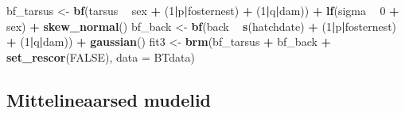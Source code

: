 \documentclass[]{book}
\newenvironment{Shaded}{\begin{snugshade}}{\end{snugshade}}
\newcommand{\KeywordTok}[1]{\textcolor[rgb]{0.13,0.29,0.53}{\textbf{#1}}}
\newcommand{\DataTypeTok}[1]{\textcolor[rgb]{0.13,0.29,0.53}{#1}}
\newcommand{\DecValTok}[1]{\textcolor[rgb]{0.00,0.00,0.81}{#1}}
\newcommand{\StringTok}[1]{\textcolor[rgb]{0.31,0.60,0.02}{#1}}
\newcommand{\OtherTok}[1]{\textcolor[rgb]{0.56,0.35,0.01}{#1}}
\newcommand{\OperatorTok}[1]{\textcolor[rgb]{0.81,0.36,0.00}{\textbf{#1}}}
\newcommand{\NormalTok}[1]{#1}
\begin{document}
\begin{Shaded}
\begin{Highlighting}[]
\NormalTok{bf_tarsus <-}\StringTok{ }\KeywordTok{bf}\NormalTok{(tarsus }\OperatorTok{~}\StringTok{ }\NormalTok{sex }\OperatorTok{+}\StringTok{ }\NormalTok{(}\DecValTok{1}\OperatorTok{|}\NormalTok{p}\OperatorTok{|}\NormalTok{fosternest) }\OperatorTok{+}\StringTok{ }\NormalTok{(}\DecValTok{1}\OperatorTok{|}\NormalTok{q}\OperatorTok{|}\NormalTok{dam)) }\OperatorTok{+}
\StringTok{  }\KeywordTok{lf}\NormalTok{(sigma }\OperatorTok{~}\StringTok{ }\DecValTok{0} \OperatorTok{+}\StringTok{ }\NormalTok{sex) }\OperatorTok{+}\StringTok{ }\KeywordTok{skew_normal}\NormalTok{()}
\NormalTok{bf_back <-}\StringTok{ }\KeywordTok{bf}\NormalTok{(back }\OperatorTok{~}\StringTok{ }\KeywordTok{s}\NormalTok{(hatchdate) }\OperatorTok{+}\StringTok{ }\NormalTok{(}\DecValTok{1}\OperatorTok{|}\NormalTok{p}\OperatorTok{|}\NormalTok{fosternest) }\OperatorTok{+}\StringTok{ }\NormalTok{(}\DecValTok{1}\OperatorTok{|}\NormalTok{q}\OperatorTok{|}\NormalTok{dam)) }\OperatorTok{+}
\StringTok{  }\KeywordTok{gaussian}\NormalTok{()}
\NormalTok{fit3 <-}\StringTok{ }\KeywordTok{brm}\NormalTok{(bf_tarsus }\OperatorTok{+}\StringTok{ }\NormalTok{bf_back }\OperatorTok{+}\StringTok{ }\KeywordTok{set_rescor}\NormalTok{(}\OtherTok{FALSE}\NormalTok{), }\DataTypeTok{data =}\NormalTok{ BTdata)}
\end{Highlighting}
\end{Shaded}

\subsection{Mittelineaarsed mudelid}\label{mittelineaarsed-mudelid}
\end{document}
